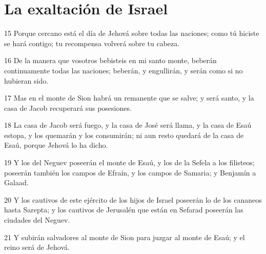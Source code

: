\section*{La exaltación de Israel}

\par 15 Porque cercano está el día de Jehová sobre todas las naciones; como tú hiciste se hará contigo; tu recompensa volverá sobre tu cabeza.
\par 16 De la manera que vosotros bebisteis en mi santo monte, beberán continuamente todas las naciones; beberán, y engullirán, y serán como si no hubieran sido.
\par 17 Mas en el monte de Sion habrá un remanente que se salve; y será santo, y la casa de Jacob recuperará sus posesiones.
\par 18 La casa de Jacob será fuego, y la casa de José será llama, y la casa de Esaú estopa, y los quemarán y los consumirán; ni aun resto quedará de la casa de Esaú, porque Jehová lo ha dicho.
\par 19 Y los del Neguev poseerán el monte de Esaú, y los de la Sefela a los filisteos; poseerán también los campos de Efraín, y los campos de Samaria; y Benjamín a Galaad.
\par 20 Y los cautivos de este ejército de los hijos de Israel poseerán lo de los cananeos hasta Sarepta; y los cautivos de Jerusalén que están en Sefarad poseerán las ciudades del Neguev.
\par 21 Y subirán salvadores al monte de Sion para juzgar al monte de Esaú; y el reino será de Jehová.

